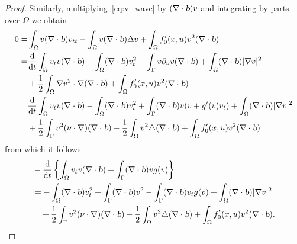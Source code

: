 \documentclass{elsarticle}
\begin{document}
\begin{proof}
Similarly, multiplying~\eqref{eq:v_wave} by $(\nabla\cdot \textsl{b})v$ and integrating by parts over $\Omega$ we obtain
\begin{equation*}
\begin{split}
    0=& \int_{\Omega}v(\nabla\cdot\textsl{b} ) v_{tt}- \int_{\Omega}v(\nabla\cdot\textsl{b} ) \Delta v +\int_{\Omega}f^{\prime}_0(x, u)v^2(\nabla\cdot\textsl{b} )\\
    =&\frac{\mathrm{d}}{\mathrm{d}t}\int_{\Omega}v_{t}v(\nabla\cdot\textsl{b} )-\int_{\Omega}(\nabla\cdot\textsl{b} )v_{t}^2 -\int_{\Gamma}v\partial_{\nu}v(\nabla\cdot \textsl{b} )+\int_{\Omega}(\nabla\cdot \textsl{b} )|\nabla v|^2\\
    &+\frac{1}{2}\int_{\Omega}\nabla v^2 \cdot \nabla(\nabla\cdot \textsl{b} )+\int_{\Omega}f^{\prime}_0(x, u)v^2(\nabla\cdot\textsl{b} )\\
    =&\frac{\mathrm{d}}{\mathrm{d}t}\int_{\Omega}v_{t}v(\nabla\cdot\textsl{b} )-\int_{\Omega}(\nabla\cdot\textsl{b} )v_{t}^2 + \int_{\Gamma}(\nabla\cdot \textsl{b} )v(v+ g^{\prime}(v)v_t)+\int_{\Omega}(\nabla\cdot \textsl{b} )|\nabla v|^2\\
    &+\frac{1}{2}\int_{\Gamma} v^2 (\nu\cdot \nabla)(\nabla\cdot \textsl{b} ) - \frac{1}{2}\int_{\Omega} v^2\triangle(\nabla\cdot \textsl{b} ) +\int_{\Omega}f^{\prime}_0(x, u)v^2(\nabla\cdot\textsl{b} )
\end{split}
\end{equation*}
from which it follows 
\begin{equation}\label{L2-4}
\begin{split}
    &-\frac{\mathrm{d}}{\mathrm{d}t}\left\{\int_{\Omega}v_{t}v(\nabla\cdot\textsl{b} )+\int_{\Gamma} (\nabla\cdot \textsl{b} )vg(v)\right\}\\
    &= -\int_{\Omega}(\nabla\cdot\textsl{b} )v_{t}^2 + \int_{\Gamma}(\nabla\cdot \textsl{b} )v^2 - \int_{\Gamma} (\nabla\cdot \textsl{b} )v_{t}g(v)+\int_{\Omega}(\nabla\cdot \textsl{b} )|\nabla v|^2 \\
    &\quad +\frac{1}{2}\int_{\Gamma} v^2 (\nu\cdot \nabla)(\nabla\cdot \textsl{b} ) - \frac{1}{2}\int_{\Omega} v^2\triangle(\nabla\cdot \textsl{b} ) +\int_{\Omega}f^{\prime}_0(x, u)v^2(\nabla\cdot\textsl{b} ).
\end{split}
\end{equation}


\end{proof}
\end{document}
